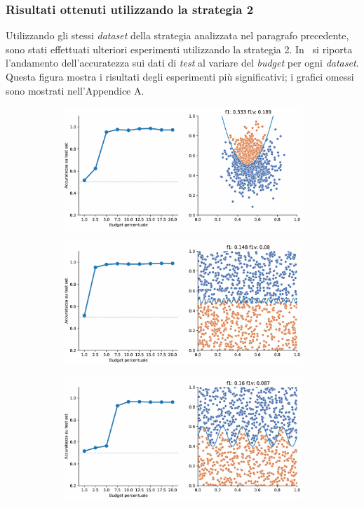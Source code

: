 \subsubsection{Risultati ottenuti utilizzando la strategia 2}
Utilizzando gli stessi \emph{dataset} della strategia analizzata nel paragrafo precedente, sono stati effettuati ulteriori esperimenti utilizzando la strategia 2.
In~ si riporta l'andamento dell'accuratezza sui dati di \emph{test} al variare del \emph{budget} per ogni \emph{dataset}.
Questa figura mostra i risultati degli esperimenti più significativi; i grafici omessi sono mostrati nell'Appendice A.

\begin{figure}[b!]
    \begin{subfigure}{\textwidth}
        \centering
        \includegraphics[width=.8\textwidth]{img/2d_v2/4.pdf}
    \end{subfigure}%
    \hfill
    \begin{subfigure}{\textwidth}
        \centering
        \includegraphics[width=.8\textwidth]{img/2d_v2/7.pdf}
    \end{subfigure}
    \hfill
    \begin{subfigure}{\textwidth}
        \centering
        \includegraphics[width=.8\textwidth]{img/2d_v2/12.pdf}

\end{subfigure}
\end{figure}
